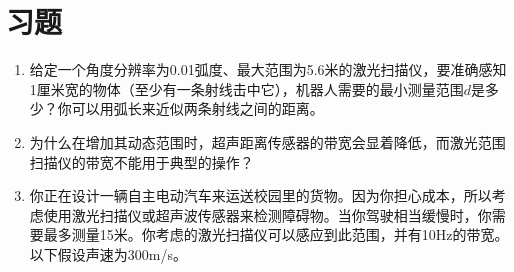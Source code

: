\section*{习题}\small
\begin{enumerate}

\item 给定一个角度分辨率为0.01弧度、最大范围为5.6米的激光扫描仪，要准确感知1厘米宽的物体（至少有一条射线击中它），机器人需要的最小测量范围$d$是多少？你可以用弧长来近似两条射线之间的距离。
\item 为什么在增加其动态范围时，超声距离传感器的带宽会显着降低，而激光范围扫描仪的带宽不能用于典型的操作？
\item 你正在设计一辆自主电动汽车来运送校园里的货物。因为你担心成本，所以考虑使用激光扫描仪或超声波传感器来检测障碍物。当你驾驶相当缓慢时，你需要最多测量15米。你考虑的激光扫描仪可以感应到此范围，并有10Hz的带宽。以下假设声速为300m/s。

\begin{enumerate}


\end{enumerate}
\end{enumerate}

